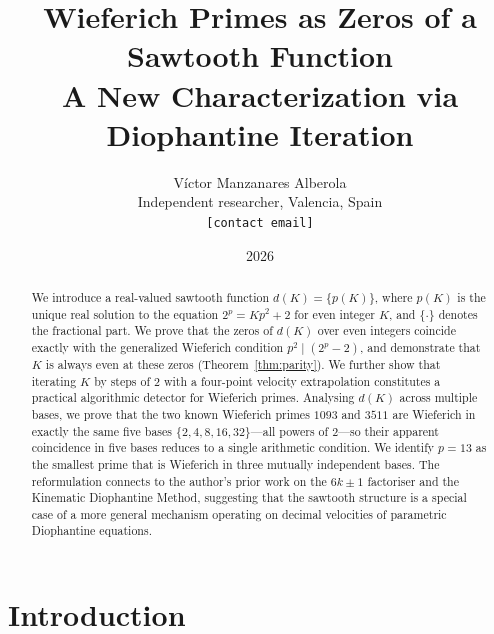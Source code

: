 \documentclass[12pt,a4paper]{article}
\theoremstyle{definition}
\theoremstyle{remark}
\begin{document}
\title{\textbf{Wieferich Primes as Zeros of a Sawtooth Function}\\[6pt]
{\large A New Characterization via Diophantine Iteration}}

\author{V\'ictor Manzanares Alberola\\[4pt]
\small Independent researcher, Valencia, Spain\\
\small \texttt{[contact email]}}

\date{2026}

\maketitle

\begin{abstract}
We introduce a real-valued sawtooth function $d(K) = \{p(K)\}$, where
$p(K)$ is the unique real solution to the equation $2^p = Kp^2 + 2$ for
even integer $K$, and $\{\cdot\}$ denotes the fractional part. We prove
that the zeros of $d(K)$ over even integers coincide exactly with the
generalized Wieferich condition $p^2 \mid (2^p - 2)$, and demonstrate
that $K$ is always even at these zeros (Theorem~\ref{thm:parity}).
We further show that iterating $K$ by steps of $2$ with a four-point
velocity extrapolation constitutes a practical algorithmic detector for
Wieferich primes. Analysing $d(K)$ across multiple bases, we prove
that the two known Wieferich primes $1093$ and $3511$ are Wieferich in
exactly the same five bases $\{2,4,8,16,32\}$---all powers of $2$---so
their apparent coincidence in five bases reduces to a single arithmetic
condition. We identify $p = 13$ as the smallest prime that is Wieferich
in three mutually independent bases. The reformulation connects to the
author's prior work on the $6k{\pm}1$ factoriser and the Kinematic
Diophantine Method, suggesting that the sawtooth structure is a special
case of a more general mechanism operating on decimal velocities of
parametric Diophantine equations.
\end{abstract}

\tableofcontents
\bigskip

\section{Introduction}
\end{document}
